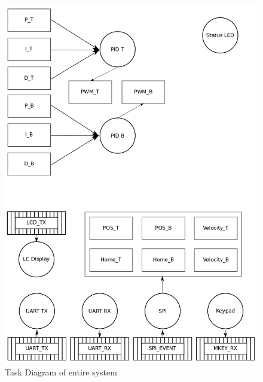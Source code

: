 \documentclass[../../../main]{subfiles}
\begin{document}
\begin{figure}[H]
\includegraphics[width=\columnwidth]{taskdiagram_full.png}
\caption{Task Diagram of entire system}
\label{fig:entire_task_diagram}
\end{figure}
\end{document}
